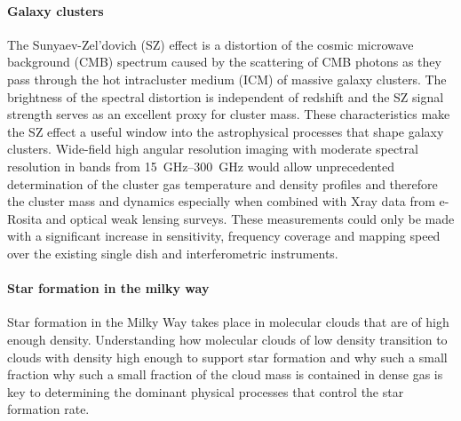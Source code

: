\paragraph*{Galaxy clusters}
The Sunyaev-Zel’dovich (SZ) effect is a distortion of the cosmic microwave background (CMB) spectrum caused by the scattering of CMB photons as they pass through the hot intracluster medium (ICM) of massive galaxy clusters. The brightness of the spectral distortion is independent of redshift and the SZ signal strength  serves as an excellent proxy for cluster mass. These characteristics make the SZ effect a useful window into the astrophysical processes that shape galaxy clusters. Wide-field high angular resolution imaging with moderate spectral resolution in bands from \SIrange{15}{300}{GHz} would allow unprecedented determination of the cluster gas temperature and density profiles and therefore the cluster mass and dynamics especially when combined with Xray data from e-Rosita and optical weak lensing surveys. These measurements could only be made with a significant increase in sensitivity, frequency coverage and mapping speed over the
existing single dish and interferometric instruments.

\paragraph*{Star formation in the milky way}
Star formation in the Milky Way takes place in molecular clouds that are of high enough density. Understanding how molecular clouds of low density transition to clouds with density high enough to support star formation and why such a small fraction why such a small fraction of the cloud mass is contained in dense gas is key to determining the dominant physical processes that control the star formation rate. 


